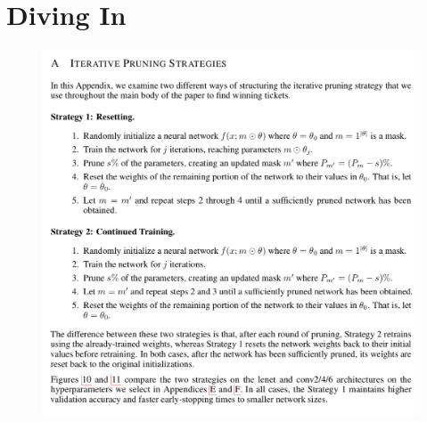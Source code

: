 \documentclass{article}
\begin{document}
 

\section{Diving In}

\begin{figure}[h]
	\begin{center}
		\includegraphics[width=.8\linewidth]{Figure/text_appendixA}
		\label{fig:appendixA}
	\end{center}
\end{figure}





\end{document}
